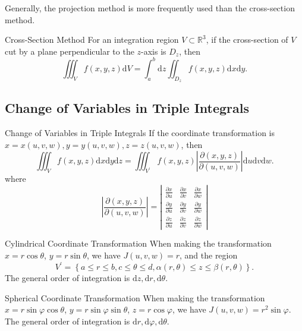 \begin{note}
  Generally, the projection method is more frequently used than the
  cross-section method.
\end{note}

\begin{proposition}{Cross-Section Method}{}
  For an integration region $V \subset \mathbb{R}^3$,
  if the cross-section of $V$ cut by a plane perpendicular
  to the $z$-axis is $D_z$, then
  \begin{equation}
    \iiint _Vf(x,y,z) \mathrm{d}V = \int ^b_a \mathrm{d}z \iint _{D_z}f(x,y,z)\mathrm{d}x\mathrm{d}y.
  \end{equation}
\end{proposition}

\subsection{Change of Variables in Triple Integrals}

\begin{proposition}{Change of Variables in Triple Integrals}{}
  If the coordinate transformation is $x = x(u,v,w), y=y(u,v,w), z=z(u,v,w)$,
  then
  \begin{equation}
     \iiint _V f(x,y,z) \mathrm{d}x\mathrm{d}y\mathrm{d}z = \iiint_{V^{\prime}}f(x,y,z)\left|\frac{\partial (x,y,z)}{\partial(u,v,w)}\right|\mathrm{d}u\mathrm{d}v\mathrm{d}w.
  \end{equation}
  where
  \begin{equation}
    \left|\frac{\partial(x,y,z)}{\partial(u,v,w)}\right| = \left|
      \begin{array}{ccc}
        \frac{\partial x}{\partial u}&\frac{\partial x}{\partial v}&\frac{\partial x}{\partial w}\\
        \frac{\partial y}{\partial u}&\frac{\partial y}{\partial v}&\frac{\partial y}{\partial w} \\
                                     \frac{\partial z}{\partial u}&\frac{\partial z}{\partial v}&\frac{\partial z}{\partial w}
      \end{array}
    \right|
  \end{equation}
\end{proposition}

\begin{proposition}{Cylindrical Coordinate Transformation}{}
  When making the transformation $x = r\cos \theta$, $y = r\sin \theta$,
  we have $J(u,v,w) = r$, and the region
  \begin{equation}
    V^{\prime} = \left\{ a \leq r \leq b, c \leq \theta \leq d, \alpha(r,\theta) \leq z \leq \beta(r,\theta) \right\}.
  \end{equation}
  The general order of integration is $\mathrm{d}z, \mathrm{d} r, \mathrm{d} \theta$.
\end{proposition}


\begin{proposition}{Spherical Coordinate Transformation}{}
  When making the transformation $x = r\sin \varphi\cos \theta$,
  $y = r\sin \varphi\sin \theta$,
  $z = r \cos \varphi$,
  we have $J(u,v,w) = r^2 \sin \varphi$.
  The general order of integration is $\mathrm{d}r, \mathrm{d} \varphi, \mathrm{d} \theta$.
\end{proposition}
